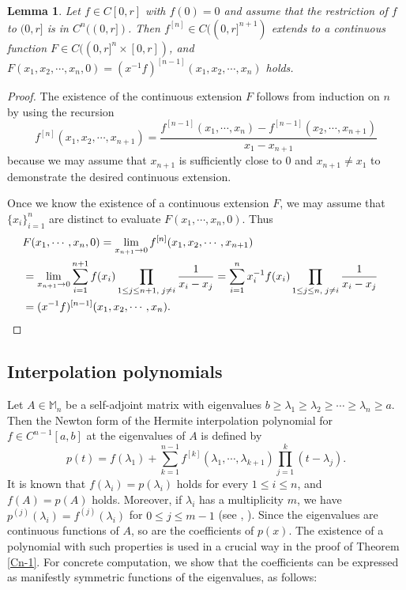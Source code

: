 \documentclass[12pt]{article}
\newtheorem{lemma}[theorem]{Lemma}
\theoremstyle{definition}
\numberwithin{equation}{section}
\newcommand{\M}{\mathbb{M}}
\begin{document}
\begin{lemma}\label{extension} Let $f\in C[0,r]$ with $f(0)=0$ and assume that the restriction of $f$ to $(0,r]$ is in $C^n((0,r])$.  
Then $f^{[n]}\in C((0,r]^{n+1})$ extends to a continuous function $F\in C((0,r]^n\times [0,r])$, and 
$F(x_1,x_2,\cdots,x_n,0)=(x^{-1}f)^{[n-1]}(x_1,x_2,\cdots,x_n)$ holds. 
\end{lemma}

\begin{proof} The existence of the continuous extension $F$ follows from induction on $n$ by using the recursion   
\[f^{[n]}(x_1,x_2,\cdots,x_{n+1})=\frac{f^{[n-1]}(x_1,\cdots, x_n)-f^{[n-1]}(x_2,\cdots,x_{n+1})}{x_1-x_{n+1}} \]
because we may assume that $x_{n+1}$ is sufficiently close to 0 and $x_{n+1}\neq x_1$ to demonstrate the desired continuous extension. 

Once we know the existence of a continuous extension $F$, we may assume that $\{x_i\}_{i=1}^n$ are distinct to evaluate 
$F(x_1,\cdots, x_n,0)$. 
Thus 
\begin{align*}
\lefteqn{F(x_1,\cdots, x_n,0)=\lim_{x_{n+1}\to 0}f^{[n]}(x_1,x_2,\cdots, x_{n+1})} \\
 &=\lim_{x_{n+1}\to 0}\sum_{i=1}^{n+1}f(x_i)\prod_{1\leq j\leq n+1,\;j\neq i}\frac{1}{x_i-x_j} 
 =\sum_{i=1}^n x_i^{-1}f(x_i)\prod_{1\leq j\leq n,\;j\neq i}\frac{1}{x_i-x_j}\\
& =(x^{-1}f)^{[n-1]}(x_1,x_2,\cdots,x_n).
\end{align*}
\end{proof}

\subsection{Interpolation polynomials}\label{interpolation}
Let $A\in \M_n$ be a self-adjoint matrix with eigenvalues $b\geq \lambda_1\geq \lambda_2\geq \cdots \geq \lambda_n\geq a$. 
Then the Newton form of the Hermite interpolation polynomial for $f\in C^{n-1}[a,b]$ at the eigenvalues of $A$ is defined by 
\[p(t)=f(\lambda_1)+\sum_{k=1}^{n-1}f^{[k]}(\lambda_1,\cdots,\lambda_{k+1})\prod_{j=1}^k(t-\lambda_j).\]
It is known that $f(\lambda_i)=p(\lambda_i)$ holds for every $1\leq i\leq n$, and $f(A)=p(A)$ holds. 
Moreover, if $\lambda_i$ has a multiplicity $m$, we have $p^{(j)}(\lambda_i)=f^{(j)}(\lambda_i)$ for $0\leq j\leq m-1$  
(see \cite[Remark 1.6]{Hig2008}, \cite[Chapter 6.1.14]{HJ1991}). 
Since the eigenvalues are continuous functions of $A$, so are the coefficients of $p(x)$. 
The existence of a polynomial with such properties is used in a crucial way in the proof of Theorem \ref{Cn-1}.     
For concrete computation, we show that the coefficients can be expressed as manifestly symmetric functions of the eigenvalues, as follows:
\end{document}
